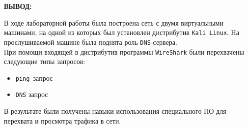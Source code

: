 \documentclass[14pt,a4paper]{extreport}
\newcommand{\header}[1]{%
{
\fontsize{16pt}{14pt}\selectfont
\begin{center}
\textbf{\MakeUppercase{#1}:}
\end{center}
}
}
\newcommand{\ping}{\texttt{ping }}
\newcommand{\dns}{\texttt{DNS}}
\begin{document}
\clearpage

\header{Вывод}

В ходе лабораторной работы была построена сеть с двумя виртуальными машинами, на одной из которых был установлен 
дистрибутив \texttt{Kali Linux}. На прослушиваемой машине была поднята роль \dns {}-сервера. \\

При помощи входящей в дистрибутив программы \texttt{WireShark} были перехвачены следующие типы запросов:

\begin{itemize}
\item \ping запрос
\item \dns {} запрос 
\end{itemize}

В результате были получены навыки использования специального ПО для перехвата и просмотра трафика в сети.
\end{document}
